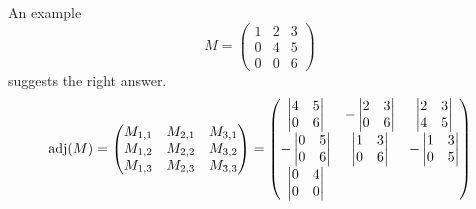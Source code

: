 \begin{exercises}
\begin{answer}
      \begin{exparts}
        \partsitem An example 
          \begin{equation*}
             M=
            \begin{pmatrix}
              1  &2  &3  \\
              0  &4  &5  \\
              0  &0  &6
            \end{pmatrix}
          \end{equation*}
          suggests the right answer.
          \begin{equation*}
            \operatorname{adj}(M)=
            \begin{pmatrix}
             M_{1,1}  &M_{2,1}  &M_{3,1}  \\
             M_{1,2}  &M_{2,2}  &M_{3,2}  \\
             M_{1,3}  &M_{2,3}  &M_{3,3}  
            \end{pmatrix}
            =\begin{pmatrix}
              \begin{vmatrix}
                4  &5 \\ 0 &6
              \end{vmatrix}
              &-\begin{vmatrix}
                2  &3  \\  0  &6
              \end{vmatrix}
              &\begin{vmatrix}
                2  &3  \\  4  &5 
              \end{vmatrix}          \\[1.5ex]
              -\begin{vmatrix}
                0  &5  \\  0  &6
              \end{vmatrix}
              &\begin{vmatrix}
                1  &3  \\  0  &6
              \end{vmatrix}
              &-\begin{vmatrix}
                1  &3  \\  0  &5  
              \end{vmatrix}           \\[1.5ex]
              \begin{vmatrix}
                0  &4  \\  0  &0

\end{vmatrix}
\end{pmatrix}
\end{equation*}
\end{exparts}
\end{answer}
\end{exercises}
